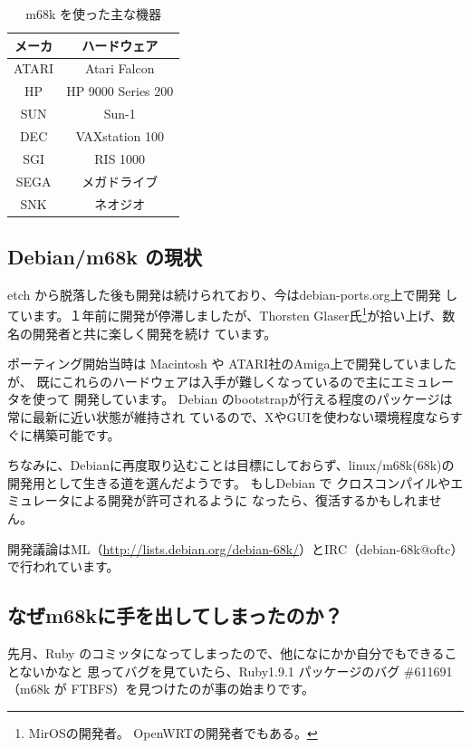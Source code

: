\documentclass[mingoth,a4paper]{jsarticle}
\begin{document}
\begin{table}
 \caption{m68k を使った主な機器}
 \label{tab:m68k-hard}
 \begin{center}
  \begin{tabular}{|c|c|}
 \hline
 メーカ & ハードウェア \\
 \hline
   ATARI & Atari Falcon \\
   HP & HP 9000 Series 200 \\
   SUN & Sun-1 \\
   DEC & VAXstation 100 \\
   SGI & RIS 1000 \\
   SEGA & メガドライブ \\
   SNK & ネオジオ \\
 \hline
 \end{tabular}
\end{center}
\end{table}

\subsection{Debian/m68k の現状}
etch から脱落した後も開発は続けられており、今はdebian-ports.org上で開発
しています。１年前に開発が停滞しましたが、Thorsten Glaser氏\footnote{MirOSの開発者。
OpenWRTの開発者でもある。}が拾い上げ、数名の開発者と共に楽しく開発を続け
ています。

ポーティング開始当時は Macintosh や ATARI社のAmiga上で開発していましたが、
既にこれらのハードウェアは入手が難しくなっているので主にエミュレータを使って
開発しています。
Debian のbootstrapが行える程度のパッケージは常に最新に近い状態が維持され
ているので、XやGUIを使わない環境程度ならすぐに構築可能です。

ちなみに、Debianに再度取り込むことは目標にしておらず、linux/m68k(68k)の
開発用として生きる道を選んだようです。
もしDebian で クロスコンパイルやエミュレータによる開発が許可されるように
なったら、復活するかもしれません。

開発議論はML（\url{http://lists.debian.org/debian-68k/}）とIRC（debian-68k@oftc）で行われています。

\subsection{なぜm68kに手を出してしまったのか？}

先月、Ruby のコミッタになってしまったので、他になにかか自分でもできることないかなと
思ってバグを見ていたら、Ruby1.9.1 パッケージのバグ \#611691 （m68k が
FTBFS）を見つけたのが事の始まりです。
\end{document}
